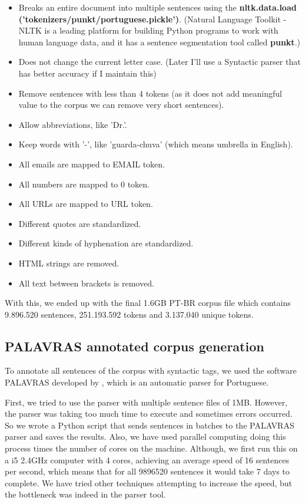 \begin{itemize}
    \item Breaks an entire document into multiple sentences using the 
    \textbf{nltk.data.load ('tokenizers/punkt/portuguese.pickle')}. (Natural Language Toolkit - NLTK is a leading platform for building Python programs to work with human language data, and it has a sentence segmentation tool called \textbf{punkt}.)
    \item Does not change the current letter case. (Later I'll use a Syntactic parser that has better accuracy if I maintain this)
    \item Remove sentences with less than 4 tokens (as it does not add meaningful value to the corpus we can remove very short sentences).
    \item Allow abbreviations, like 'Dr.'.
    \item Keep words with '-', like 'guarda-chuva' (which means umbrella in English).
    \item All emails are mapped to EMAIL token.
    \item All numbers are mapped to 0 token.
    \item All URLs are mapped to URL token.
    \item Different quotes are standardized.
    \item Different kinds of hyphenation are standardized.
    \item HTML strings are removed.
    \item All text between brackets is removed.
\end{itemize}

With this, we ended up with the final 1.6GB PT-BR corpus file which contains 9.896.520 sentences, 251.193.592 tokens and 3.137.040 unique tokens.


\subsection{PALAVRAS annotated corpus generation}\label{chap:methodsandmaterials:palavras}

To annotate all sentences of the corpus with syntactic tags, we used the software PALAVRAS developed by , which is an automatic parser for Portuguese.

First, we tried to use the parser with multiple sentence files of 1MB. However, the parser was taking too much time to execute and sometimes errors occurred. So we wrote a Python script that sends sentences in batches to the PALAVRAS parser and saves the results. Also, we have used parallel computing doing this process times the number of cores on the machine. Although, we first run this on a i5 2.4GHz computer with 4 cores, achieving an average speed of 16 sentences per second, which means that for all 9896520 sentences it would take 7 days to complete. We have tried other techniques attempting to increase the speed, but the bottleneck was indeed in the parser tool. 

